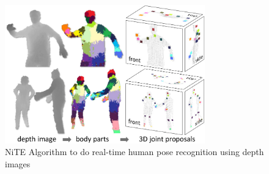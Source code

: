 \begin{figure}
	[h] \centering 
	\includegraphics[height=6cm]{figures/content/ni-alg.jpg} \caption{NiTE Algorithm to do real-time human pose recognition using depth images} \label{fg:ni:alg} 
\end{figure}
